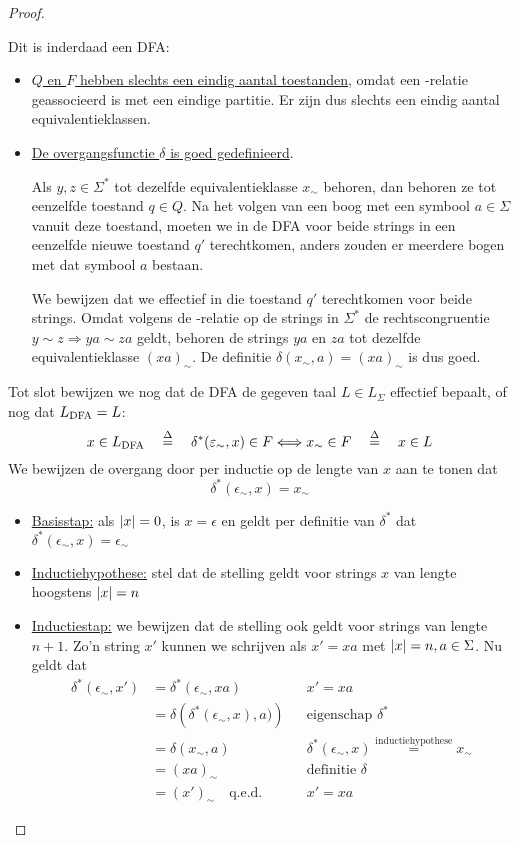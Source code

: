 \documentclass[../aanvullingen_cursus.tex]{subfiles}
\begin{document}
\begin{proof}
\begin{enumerate}
		Dit is inderdaad een DFA:
		\begin{itemize}
			\item  \underline{\(Q\) en \(F\) hebben slechts een eindig aantal toestanden}, omdat een \mnl-relatie geassocieerd is met een eindige partitie. Er zijn dus slechts een eindig aantal equivalentieklassen.
			\item \underline{De overgangsfunctie \(\delta\) is goed gedefinieerd}.

			Als \(y,z\in\Sigma^*\) tot dezelfde equivalentieklasse \(x_\sim\) behoren, dan behoren ze tot eenzelfde toestand \(q\in Q\). Na het volgen van een boog met een symbool \(a \in \Sigma\) vanuit deze toestand, moeten we in de DFA voor beide strings in een eenzelfde nieuwe toestand \(q'\) terechtkomen, anders zouden er meerdere bogen met dat symbool \(a\) bestaan.

			We bewijzen dat we effectief in die toestand \(q'\) terechtkomen voor beide strings. Omdat volgens de \mnl-relatie op de strings in \(\Sigma^*\) de rechtscongruentie \(y \sim z \Rightarrow ya \sim za\) geldt, behoren de strings \(ya\) en \(za\) tot dezelfde equivalentieklasse \((xa)_\sim\). De definitie \(\delta(x_\sim,a)=(xa)_\sim\) is dus goed.
		\end{itemize}

		Tot slot bewijzen we nog dat de DFA de gegeven taal \(L \in L_\Sigma\) effectief bepaalt, of nog dat \(L_{\text{DFA}} = L\): \[x \in L_{\text{DFA}} \quad \overset{\Delta}{=} \quad \delta^*(\varepsilon_\sim,x)\in F \Longleftrightarrow x_\sim \in F \quad \overset{\Delta}{=} \quad x\in L \] We bewijzen de overgang door per inductie op de lengte van \(x\) aan te tonen dat \[\delta^*(\epsilon_\sim,x)=x_\sim\]
		\begin{itemize}
			\item \underline{Basisstap:} als \(\lvert x \rvert=0\), is \(x=\epsilon\) en geldt per definitie van \(\delta^*\) dat \(\delta^*(\epsilon_\sim,x)=\epsilon_\sim\)
			\item \underline{Inductiehypothese:} stel dat de stelling geldt voor strings \(x\) van lengte hoogstens \(\lvert x \rvert=n\)
			\item \underline{Inductiestap:} we bewijzen dat de stelling ook geldt voor strings van lengte \(n+1\). Zo'n string \(x'\) kunnen we schrijven als \(x'=xa\) met \(\lvert x \rvert=n,a\in \Sigma\). Nu geldt dat
			\begin{align*}
				\delta^*(\epsilon_\sim,x')&=\delta^*(\epsilon_\sim,xa) && x'=xa\\
				&=\delta\left(\delta^*(\epsilon_\sim,x),a)\right) && \text{eigenschap } \delta^* \\
				&=\delta(x_\sim,a) && \delta^*(\epsilon_\sim,x) \overset{\text{inductiehypothese}}{=}x_\sim \\
				&=(xa)_\sim && \text{definitie } \delta \\
				&=(x')_\sim \quad \text{q.e.d.} && x'=xa
			\end{align*}
		\end{itemize}
	\end{enumerate}


\end{proof}
\end{document}
